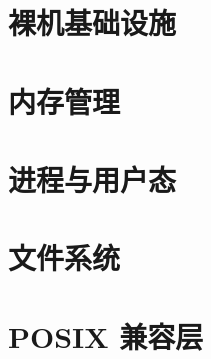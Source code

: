 \documentclass[12pt, a4paper, openany]{book}
\begin{document}
\part{裸机基础设施}







\part{内存管理}







\part{进程与用户态}







\part{文件系统}






\part{POSIX 兼容层}
\end{document}

